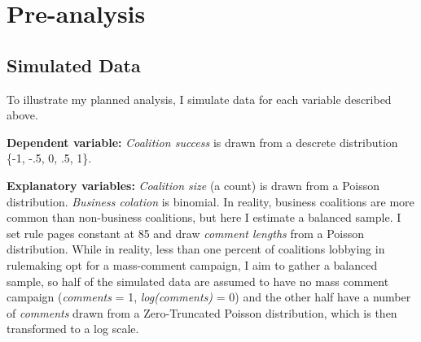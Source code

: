 \documentclass[
      12pt,
        ]{article}
\author{}
\date{\today}
\begin{document}
 














\noindent 
    \hypertarget{pre-analysis}{%
\section{Pre-analysis}\label{pre-analysis}}

\hypertarget{simulated-data}{%
\subsection{Simulated Data}\label{simulated-data}}

To illustrate my planned analysis, I simulate data for each variable described above.

\textbf{Dependent variable:} \emph{Coalition success} is drawn from a descrete distribution \{-1, -.5, 0, .5, 1\}.

\textbf{Explanatory variables:} \emph{Coalition size} (a count) is drawn from a Poisson distribution. \emph{Business colation} is binomial. In reality, business coalitions are more common than non-business coalitions, but here I estimate a balanced sample. I set rule pages constant at 85 and draw \emph{comment lengths} from a Poisson distribution. While in reality, less than one percent of coalitions lobbying in rulemaking opt for a mass-comment campaign, I aim to gather a balanced sample, so half of the simulated data are assumed to have no mass comment campaign (\emph{comments} = 1, \emph{log(comments)} = 0) and the other half have a number of \emph{comments} drawn from a Zero-Truncated Poisson distribution, which is then transformed to a log scale.
\end{document}
